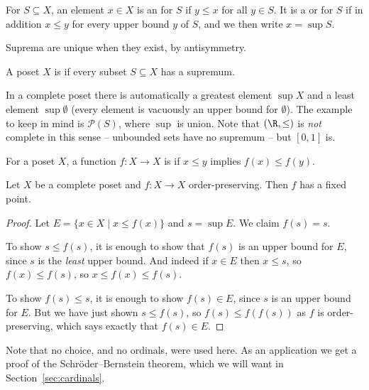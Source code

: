 \begin{definition}
  For $S \subseteq X$, an element $x \in X$ is an  for $S$ if $y \leq x$ for all $y \in S$. It is a  or  for $S$ if in addition $x \leq y$ for every upper bound $y$ of $S$, and we then write $x = \sup S$.
\end{definition}

Suprema are unique when they exist, by antisymmetry.

\begin{definition}
  A poset $X$ is  if every subset $S \subseteq X$ has a supremum.
\end{definition}

In a complete poset there is automatically a greatest element $\sup X$ and a least element $\sup \emptyset$ (every element is vacuously an upper bound for $\emptyset$). The example to keep in mind is $\mathcal{P}(S)$, where $\sup$ is union. Note that $(\R, \leq)$ is \emph{not} complete in this sense -- unbounded sets have no supremum -- but $[0,1]$ is.

\begin{definition}
  For a poset $X$, a function $f: X \rightarrow X$ is  if $x \leq y$ implies $f(x) \leq f(y)$.
\end{definition}

\begin{theorem}\label{thm:knastertarski}
  Let $X$ be a complete poset and $f: X \rightarrow X$ order-preserving. Then $f$ has a fixed point.
\end{theorem}
\begin{proof}
  Let $E = \{x \in X \mid x \leq f(x)\}$ and $s = \sup E$. We claim $f(s) = s$.

  To show $s \leq f(s)$, it is enough to show that $f(s)$ is an upper bound for $E$, since $s$ is the \emph{least} upper bound. And indeed if $x \in E$ then $x \leq s$, so $f(x) \leq f(s)$, so $x \leq f(x) \leq f(s)$.

  To show $f(s) \leq s$, it is enough to show $f(s) \in E$, since $s$ is an upper bound for $E$. But we have just shown $s \leq f(s)$, so $f(s) \leq f(f(s))$ as $f$ is order-preserving, which says exactly that $f(s) \in E$.
\end{proof}

Note that no choice, and no ordinals, were used here. As an application we get a proof of the Schr\"oder--Bernstein theorem, which we will want in Section~\ref{sec:cardinals}.


